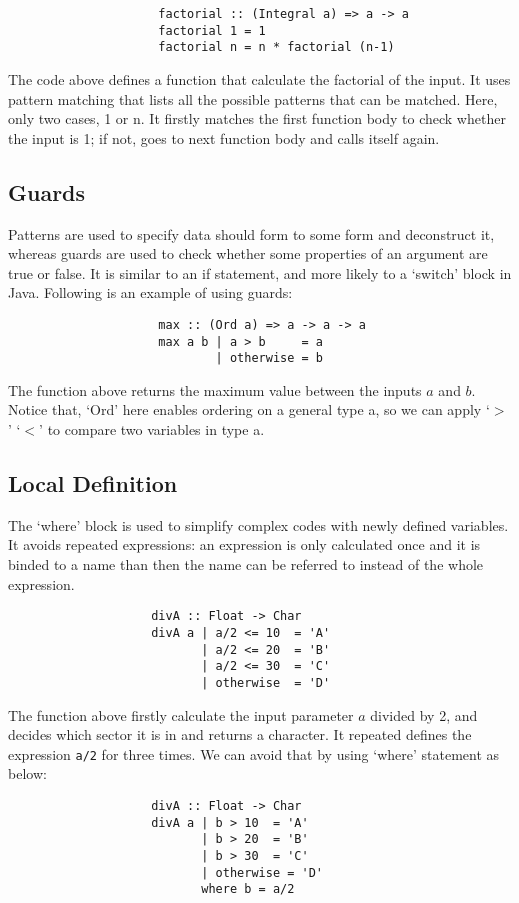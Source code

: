 \begin{verbatim}
                     factorial :: (Integral a) => a -> a  
                     factorial 1 = 1
                     factorial n = n * factorial (n-1)
\end{verbatim}

The code above defines a function that calculate the factorial of the input. It uses pattern matching that lists all the possible patterns that can be matched. Here, only two cases, 1 or n. It firstly matches the first function body to check whether the input is 1; if not, goes to next function body and calls itself again.   

\subsection{Guards}

Patterns are used to specify data should form to some form and deconstruct it, whereas guards are used to check whether some properties of an argument are true or false. It is similar to an if statement, and more likely to a `switch' block in Java. Following is an example of using guards:
\begin{verbatim}
                     max :: (Ord a) => a -> a -> a
                     max a b | a > b     = a
                             | otherwise = b
\end{verbatim}
The function above returns the maximum value between the inputs $a$ and $b$. Notice that, `Ord' here enables ordering on a general type a, so we can apply `$>$' `$<$' to compare two variables in type a.

\subsection{Local Definition}

The `where' block is used to simplify complex codes with newly defined variables. It avoids repeated expressions: an expression is only calculated once and it is binded to a name than then the name can be referred to instead of the whole expression. 

\begin{verbatim}
                    divA :: Float -> Char
                    divA a | a/2 <= 10  = 'A' 
                           | a/2 <= 20  = 'B'
                           | a/2 <= 30  = 'C'
                           | otherwise  = 'D'
\end{verbatim}

The function above firstly calculate the input parameter $a$ divided by 2, and decides which sector it is in and returns a character. It repeated defines the expression \verb|a/2| for three times. We can avoid that by using `where' statement as below: 
\begin{verbatim}
                    divA :: Float -> Char
                    divA a | b > 10  = 'A' 
                           | b > 20  = 'B'
                           | b > 30  = 'C'
                           | otherwise = 'D'
                           where b = a/2
\end{verbatim}

